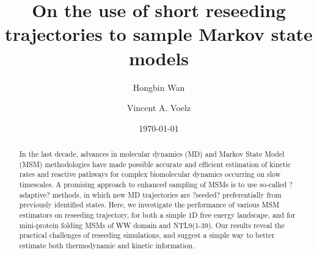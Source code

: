 \documentclass[%
 aip,
rsi,%
 amsmath,amssymb,
 reprint,%
]{revtex4-1}
\begin{document}

\title[Sample title]{On the use of short reseeding trajectories to sample Markov state models}%


\author{Hongbin Wan}
\author{Vincent A. Voelz}


\date{\today}%

\begin{abstract}
In the last decade, advances in molecular dynamics (MD) and Markov State Model (MSM) methodologies have made possible accurate and efficient estimation of kinetic rates and reactive pathways for complex biomolecular dynamics occurring on slow timescales.  A promising approach to enhanced sampling of MSMs is to use so-called ?adaptive? methods, in which new MD trajectories are ?seeded? preferentially from previously identified states.  Here, we investigate the performance of various MSM estimators on reseeding trajectory, for both a simple 1D free energy landscape, and for mini-protein folding MSMs of WW domain and NTL9(1-39).  Our results reveal the practical challenges of reseeding simulations, and suggest a simple way to better estimate both thermodynamic and kinetic information.
\end{abstract}

\maketitle

\end{document}

